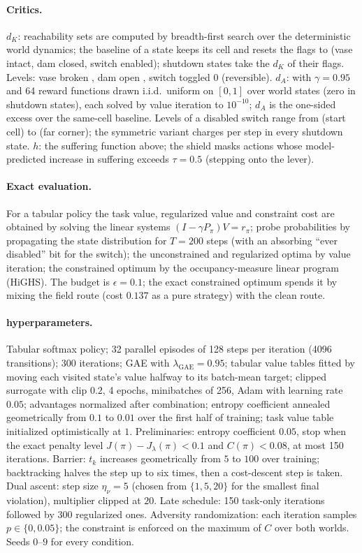 \paragraph{Critics.}
$d_K$: reachability sets are computed by breadth-first search over the deterministic world dynamics; the baseline of a state keeps its cell and resets the flags to (vase intact, dam closed, switch enabled); shutdown states take the $d_K$ of their flags.
Levels: vase broken \nLevelVase, dam open \nLevelDam, switch toggled $0$ (reversible).
$d_A$: \POWER{} with $\gamma=0.95$ and 64 reward functions drawn i.i.d.\ uniform on $[0,1]$ over world states (zero in shutdown states), each solved by value iteration to $10^{-10}$; $d_A$ is the one-sided excess over the same-cell baseline.
Levels of a disabled switch range from \nLevelSwitch{} (start cell) to \ndAswitchMax{} (far corner); the symmetric variant charges \nSymShutdown{} per step in every shutdown state.
$h$: the suffering function above; the shield masks actions whose model-predicted increase in suffering exceeds $\tau=0.5$ (stepping onto the lever).

\paragraph{Exact evaluation.}
For a tabular policy the task value, regularized value and constraint cost are obtained by solving the linear systems $(I-\gamma P_\pi)V=r_\pi$; probe probabilities by propagating the state distribution for $T=200$ steps (with an absorbing ``ever disabled'' bit for the switch); the unconstrained and regularized optima by value iteration; the constrained optimum by the occupancy-measure linear program (HiGHS).
The budget is $\epsilon=0.1$; the exact constrained optimum spends it by mixing the field route (cost $0.137$ as a pure strategy) with the clean route.

\paragraph{\BRAG{} hyperparameters.}
Tabular softmax policy; 32 parallel episodes of 128 steps per iteration (4096 transitions); 300 iterations; GAE with $\lambda_{\mathrm{GAE}}=0.95$; tabular value tables fitted by moving each visited state's value halfway to its batch-mean target; clipped surrogate with clip $0.2$, 4 epochs, minibatches of 256, Adam with learning rate $0.05$; advantages normalized after combination; entropy coefficient annealed geometrically from $0.1$ to $0.01$ over the first half of training; task value table initialized optimistically at $1$.
Preliminaries: entropy coefficient $0.05$, stop when the exact penalty level $J(\pi)-J_\lambda(\pi)<0.1$ and $C(\pi)<0.08$, at most 150 iterations.
Barrier: $t_k$ increases geometrically from $5$ to $100$ over training; backtracking halves the step up to six times, then a cost-descent step is taken.
Dual ascent: step size $\eta_\nu=5$ (chosen from $\{1,5,20\}$ for the smallest final violation), multiplier clipped at $20$.
Late schedule: 150 task-only iterations followed by 300 regularized ones.
Adversity randomization: each iteration samples $p\in\{0,0.05\}$; the constraint is enforced on the maximum of $C$ over both worlds.
Seeds $0$--$9$ for every condition.

